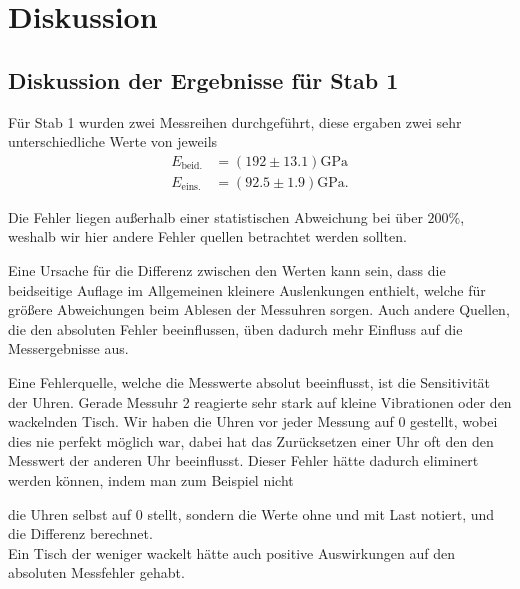 \section{Diskussion}
\label{sec:Diskussion}

\subsection{Diskussion der Ergebnisse für Stab 1}

Für Stab 1 wurden zwei Messreihen durchgeführt, diese ergaben zwei sehr 
unterschiedliche Werte von jeweils
\begin{align}
	E_\text{beid.} &= (192 \pm 13.1) \si{\giga\pascal} \\
	E_\text{eins.} &= (92.5 \pm 1.9) \si{\giga\pascal}.
\end{align}

Die Fehler liegen außerhalb einer statistischen Abweichung bei über $200\%$,
weshalb wir hier andere Fehler quellen betrachtet werden sollten.

Eine Ursache für die Differenz zwischen den Werten kann sein, dass die beidseitige
Auflage im Allgemeinen kleinere Auslenkungen enthielt, welche für größere 
Abweichungen beim Ablesen der Messuhren sorgen. Auch andere Quellen, die den absoluten
Fehler beeinflussen, üben dadurch mehr Einfluss auf die Messergebnisse aus.

Eine Fehlerquelle, welche die Messwerte absolut beeinflusst, ist die 
Sensitivität der Uhren. Gerade Messuhr 2 reagierte sehr stark auf kleine Vibrationen 
oder den wackelnden Tisch. Wir haben die Uhren vor jeder Messung auf 0 gestellt,
wobei dies nie perfekt möglich war, dabei hat das Zurücksetzen einer Uhr oft den 
den Messwert der anderen Uhr beeinflusst.
Dieser Fehler hätte dadurch eliminert werden können, indem man zum Beispiel nicht 

die Uhren selbst auf 0 stellt, sondern die Werte ohne und mit Last notiert, und
die Differenz berechnet.
\\
Ein Tisch der weniger wackelt hätte auch positive Auswirkungen auf den absoluten
Messfehler gehabt.
